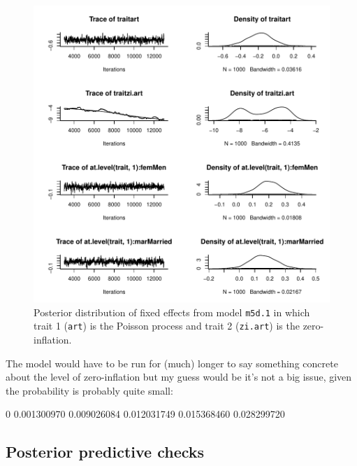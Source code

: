 \documentclass{article}
\begin{document}
\begin{figure}[!h]
\begin{center}
\includegraphics{Lecture5-039}
\end{center}
\caption{Posterior distribution of fixed effects from model \texttt{m5d.1} in which trait 1 (\texttt{art}) is the Poisson process and trait 2 (\texttt{zi.art}) is the zero-inflation.}
\label{ZIP}
\end{figure}

The model would have to be run for (much) longer to say something concrete about the level of zero-inflation but my guess would be it's not a big issue, given the probability is probably quite small:

\begin{Schunk}
\begin{Soutput}
         0%
0.001300970 0.009026084 0.012031749 0.015368460 0.028299720 
\end{Soutput}
\end{Schunk}

\subsection{Posterior predictive checks}
\end{document}
